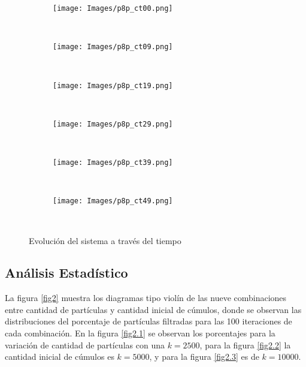 \documentclass{article}
\begin{document}
\begin{figure}
     \begin{subfigure}[b]{0.49\textwidth}
         \centering
         \texttt{[image: Images/p8p\_ct00.png]}
         \caption{\ }
     \end{subfigure}
     \begin{subfigure}[b]{0.49\textwidth}
         \centering
         \texttt{[image: Images/p8p\_ct09.png]}
         \caption{\ }
     \end{subfigure}
     \begin{subfigure}[b]{0.49\textwidth}
         \centering
         \texttt{[image: Images/p8p\_ct19.png]}
         \caption{\ }
     \end{subfigure}
     \begin{subfigure}[b]{0.49\textwidth}
         \centering
         \texttt{[image: Images/p8p\_ct29.png]}
         \caption{\ }
     \end{subfigure}
     \begin{subfigure}[b]{0.49\textwidth}
         \centering
         \texttt{[image: Images/p8p\_ct39.png]}
         \caption{\ }
     \end{subfigure}
     \begin{subfigure}[b]{0.49\textwidth}
         \centering
         \texttt{[image: Images/p8p\_ct49.png]}
         \caption{\ }
     \end{subfigure}
     \caption{Evoluci\'on del sistema a trav\'es del tiempo}
     \label{fig1}
\end{figure}

\newpage

\subsection{An\'alisis Estad\'istico}
La figura \ref{fig2} muestra los diagramas tipo viol\'in de las nueve combinaciones entre cantidad de part\'iculas y cantidad inicial de c\'umulos, donde se observan las distribuciones del porcentaje de part\'iculas filtradas para las 100 iteraciones de cada combinaci\'on. En la figura \ref{fig2.1} se observan los porcentajes para la variaci\'on de cantidad de part\'iculas con una $k=2500$, para la figura \ref{fig2.2} la cantidad inicial de c\'umulos es $k=5000$, y para la figura \ref{fig2.3} es de $k=10000$.\\
\end{document}

